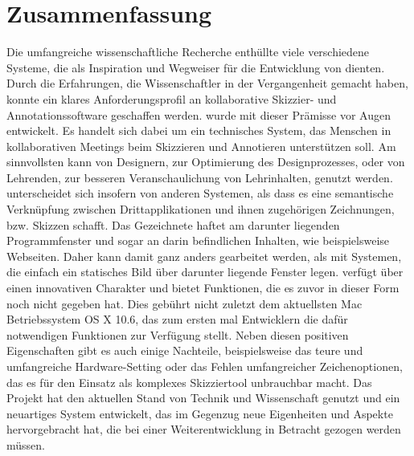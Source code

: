 \section*{Zusammenfassung}
Die umfangreiche wissenschaftliche Recherche enthüllte viele verschiedene Systeme, die als Inspiration und Wegweiser für die Entwicklung von \scribbler dienten. Durch die Erfahrungen, die Wissenschaftler in der Vergangenheit gemacht haben, konnte ein klares Anforderungsprofil an kollaborative Skizzier- und Annotationssoftware geschaffen werden. \scribbler wurde mit dieser Prämisse vor Augen entwickelt. Es handelt sich dabei um ein technisches System, das Menschen in kollaborativen Meetings beim Skizzieren und Annotieren unterstützen soll. Am sinnvollsten kann \scribbler von Designern, zur Optimierung des Designprozesses, oder von Lehrenden, zur besseren Veranschaulichung von Lehrinhalten, genutzt werden. \scribbler unterscheidet sich insofern von anderen Systemen, als dass es eine semantische Verknüpfung zwischen Drittapplikationen und ihnen zugehörigen Zeichnungen, bzw. Skizzen schafft. Das Gezeichnete haftet am darunter liegenden Programmfenster und sogar an darin befindlichen Inhalten, wie beispielsweise Webseiten. Daher kann damit ganz anders gearbeitet werden, als mit Systemen, die einfach ein statisches Bild über darunter liegende Fenster legen. \scribbler verfügt über einen innovativen Charakter und bietet Funktionen, die es zuvor in dieser Form noch nicht gegeben hat. Dies gebührt nicht zuletzt dem aktuellsten Mac Betriebssystem OS X 10.6, das zum ersten mal Entwicklern die dafür notwendigen Funktionen zur Verfügung stellt. Neben diesen positiven Eigenschaften gibt es auch einige Nachteile, beispielsweise das teure und umfangreiche Hardware-Setting oder das Fehlen umfangreicher Zeichenoptionen, das es für den Einsatz als komplexes Skizziertool unbrauchbar macht. Das Projekt \scribbler hat den aktuellen Stand von Technik und Wissenschaft genutzt und ein neuartiges System entwickelt, das im Gegenzug neue Eigenheiten und Aspekte hervorgebracht hat, die bei einer Weiterentwicklung in Betracht gezogen werden müssen. 
